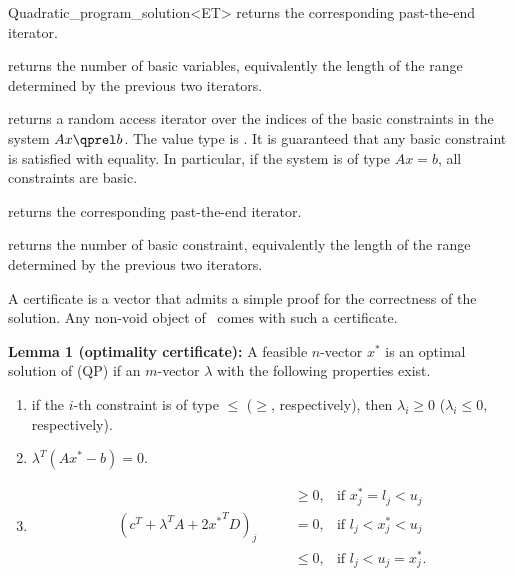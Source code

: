 \begin{ccRefClass}{Quadratic_program_solution<ET>}
{returns the corresponding past-the-end iterator.}

{returns the number of basic variables, equivalently the length
of the range determined by the previous two iterators.}

\ccExample
{}

{returns a random access iterator over the indices of the basic
constraints in the system $Ax\qprel b$. The value type is . 
It is guaranteed that any basic constraint is satisfied with equality.
In particular, if the system is of type $Ax=b$, all constraints are
basic.}

{returns the corresponding past-the-end iterator.}

{returns the number of basic constraint, equivalently the length
of the range determined by the previous two iterators.}

\ccExample
{}

\begin{ccAdvanced}

A certificate is a vector that admits a simple proof for the 
correctness of the solution. Any non-void object of \ccRefName\ 
comes with such a certificate.

{\bf Lemma 1 (optimality certificate):} A feasible $n$-vector $x^*$ 
is an optimal solution of (QP) if an $m$-vector $\lambda$ with the
following properties exist.
\begin{enumerate}
\item if the $i$-th constraint is of type $\leq$ ($\geq$, respectively), 
then $\lambda_i\geq 0$ ($\lambda_i\leq 0$, respectively).
\item $\lambda^T(Ax^*-b) = 0$.
\item \[
\begin{array}{llll}
&&\geq 0, & \mbox{if $x^*_j = l_j < u_j$} \\
(c^T + \lambda^T A + 2{x^*}^TD)_j& \quad  &= 0, & \mbox{if $l_j < x^*_j < u_j$} \\
&&\leq 0, & \mbox{if $l_j < u_j = x^*_j$.}
\end{array}\]
\end{enumerate}


\end{ccAdvanced}
\end{ccRefClass}
